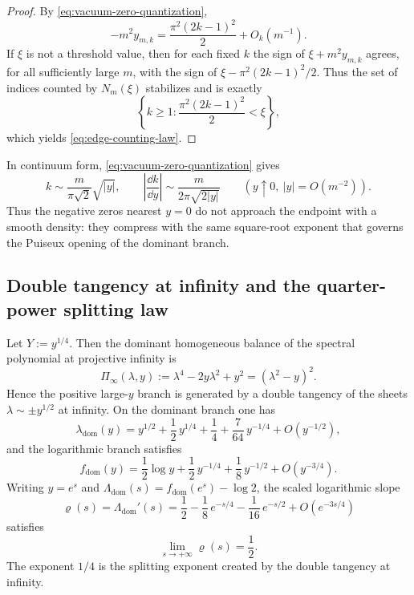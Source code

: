 \begin{proof}
By \eqref{eq:vacuum-zero-quantization},
\[
-m^2 y_{m,k}
=
\frac{\pi^2(2k-1)^2}{2}+O_k(m^{-1}).
\]
If $\xi$ is not a threshold value, then for each fixed $k$ the sign of
\(
\xi+m^2y_{m,k}
\)
agrees, for all sufficiently large $m$, with the sign of
\(
\xi-\pi^2(2k-1)^2/2.
\)
Thus the set of indices counted by $N_m(\xi)$ stabilizes and is exactly
\[
\left\{
k\ge1:
\frac{\pi^2(2k-1)^2}{2}<\xi
\right\},
\]
which yields \eqref{eq:edge-counting-law}.
\end{proof}

In continuum form, \eqref{eq:vacuum-zero-quantization} gives
\[
k \sim \frac{m}{\pi\sqrt2}\sqrt{|y|},
\qquad
\left|\frac{\dd k}{\dd y}\right|
\sim
\frac{m}{2\pi\sqrt{2|y|}}
\qquad
(y\uparrow 0,\ |y|=O(m^{-2})).
\]
Thus the negative zeros nearest \(y=0\) do not approach the endpoint with a smooth density: they compress with the same square-root exponent that governs the Puiseux opening of the dominant branch.

\subsection{Double tangency at infinity and the quarter-power splitting law}\label{subsec:large-y-splitting}

\begin{proposition}\label{prop:saturation}
Let $Y:=y^{1/4}$.
Then the dominant homogeneous balance of the spectral polynomial at projective infinity is
\begin{equation}\label{eq:infinity-balance}
\Pi_\infty(\lambda,y)
:=
\lambda^4-2y\lambda^2+y^2
=(\lambda^2-y)^2.
\end{equation}
Hence the positive large-\(y\) branch is generated by a double tangency of the sheets $\lambda\sim \pm y^{1/2}$ at infinity.
On the dominant branch one has
\begin{equation}\label{eq:lambda-high-y}
\lambda_{\mathrm{dom}}(y)
= y^{1/2} + \frac{1}{2}\,y^{1/4} + \frac{1}{4}
+ \frac{7}{64}\,y^{-1/4} + O(y^{-1/2}),
\end{equation}
and the logarithmic branch satisfies
\begin{equation}\label{eq:f-high-y}
f_{\mathrm{dom}}(y)
= \frac{1}{2}\log y + \frac{1}{2}\,y^{-1/4}
+ \frac{1}{8}\,y^{-1/2} + O(y^{-3/4}).
\end{equation}
Writing $y = e^s$ and $\Lambda_{\mathrm{dom}}(s) = f_{\mathrm{dom}}(e^s) - \log 2$, the scaled logarithmic slope
\begin{equation}\label{eq:rho-saturation}
\varrho(s) = \Lambda_{\mathrm{dom}}'(s)
= \frac{1}{2} - \frac{1}{8}\,e^{-s/4}
- \frac{1}{16}\,e^{-s/2} + O(e^{-3s/4})
\end{equation}
satisfies
\[
\lim_{s \to +\infty} \varrho(s) = \frac{1}{2}.
\]
The exponent $1/4$ is the splitting exponent created by the double tangency at infinity.
\end{proposition}

